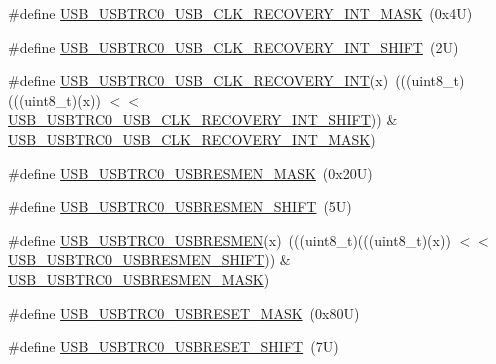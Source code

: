 \begin{DoxyCompactItemize}
\#define \mbox{\hyperlink{group___u_s_b___register___masks_ga588ecdb5189b26730014b09713a834db}{U\+S\+B\+\_\+\+U\+S\+B\+T\+R\+C0\+\_\+\+U\+S\+B\+\_\+\+C\+L\+K\+\_\+\+R\+E\+C\+O\+V\+E\+R\+Y\+\_\+\+I\+N\+T\+\_\+\+M\+A\+SK}}~(0x4\+U)
\item 
\#define \mbox{\hyperlink{group___u_s_b___register___masks_ga10874c5a9f0c051773c2ed43af3375fe}{U\+S\+B\+\_\+\+U\+S\+B\+T\+R\+C0\+\_\+\+U\+S\+B\+\_\+\+C\+L\+K\+\_\+\+R\+E\+C\+O\+V\+E\+R\+Y\+\_\+\+I\+N\+T\+\_\+\+S\+H\+I\+FT}}~(2\+U)
\item 
\#define \mbox{\hyperlink{group___u_s_b___register___masks_ga894dfcada08a458b11641438d7ed4589}{U\+S\+B\+\_\+\+U\+S\+B\+T\+R\+C0\+\_\+\+U\+S\+B\+\_\+\+C\+L\+K\+\_\+\+R\+E\+C\+O\+V\+E\+R\+Y\+\_\+\+I\+NT}}(x)~(((uint8\+\_\+t)(((uint8\+\_\+t)(x)) $<$$<$ \mbox{\hyperlink{group___u_s_b___register___masks_ga10874c5a9f0c051773c2ed43af3375fe}{U\+S\+B\+\_\+\+U\+S\+B\+T\+R\+C0\+\_\+\+U\+S\+B\+\_\+\+C\+L\+K\+\_\+\+R\+E\+C\+O\+V\+E\+R\+Y\+\_\+\+I\+N\+T\+\_\+\+S\+H\+I\+FT}})) \& \mbox{\hyperlink{group___u_s_b___register___masks_ga588ecdb5189b26730014b09713a834db}{U\+S\+B\+\_\+\+U\+S\+B\+T\+R\+C0\+\_\+\+U\+S\+B\+\_\+\+C\+L\+K\+\_\+\+R\+E\+C\+O\+V\+E\+R\+Y\+\_\+\+I\+N\+T\+\_\+\+M\+A\+SK}})
\item 
\#define \mbox{\hyperlink{group___u_s_b___register___masks_gaf236b1fdfa7f7dab54961c74538dfb75}{U\+S\+B\+\_\+\+U\+S\+B\+T\+R\+C0\+\_\+\+U\+S\+B\+R\+E\+S\+M\+E\+N\+\_\+\+M\+A\+SK}}~(0x20\+U)
\item 
\#define \mbox{\hyperlink{group___u_s_b___register___masks_ga4b62f293769f60cae99319d6bb1299e8}{U\+S\+B\+\_\+\+U\+S\+B\+T\+R\+C0\+\_\+\+U\+S\+B\+R\+E\+S\+M\+E\+N\+\_\+\+S\+H\+I\+FT}}~(5\+U)
\item 
\#define \mbox{\hyperlink{group___u_s_b___register___masks_ga8cfb473cdf63dce69fbae3b03e5fa0b9}{U\+S\+B\+\_\+\+U\+S\+B\+T\+R\+C0\+\_\+\+U\+S\+B\+R\+E\+S\+M\+EN}}(x)~(((uint8\+\_\+t)(((uint8\+\_\+t)(x)) $<$$<$ \mbox{\hyperlink{group___u_s_b___register___masks_ga4b62f293769f60cae99319d6bb1299e8}{U\+S\+B\+\_\+\+U\+S\+B\+T\+R\+C0\+\_\+\+U\+S\+B\+R\+E\+S\+M\+E\+N\+\_\+\+S\+H\+I\+FT}})) \& \mbox{\hyperlink{group___u_s_b___register___masks_gaf236b1fdfa7f7dab54961c74538dfb75}{U\+S\+B\+\_\+\+U\+S\+B\+T\+R\+C0\+\_\+\+U\+S\+B\+R\+E\+S\+M\+E\+N\+\_\+\+M\+A\+SK}})
\item 
\#define \mbox{\hyperlink{group___u_s_b___register___masks_ga3b307f8358be6942775121b6a92243ab}{U\+S\+B\+\_\+\+U\+S\+B\+T\+R\+C0\+\_\+\+U\+S\+B\+R\+E\+S\+E\+T\+\_\+\+M\+A\+SK}}~(0x80\+U)
\item 
\#define \mbox{\hyperlink{group___u_s_b___register___masks_gab20fcb9276a34cbbd33ac0364c419f13}{U\+S\+B\+\_\+\+U\+S\+B\+T\+R\+C0\+\_\+\+U\+S\+B\+R\+E\+S\+E\+T\+\_\+\+S\+H\+I\+FT}}~(7\+U)

\end{DoxyCompactItemize}
